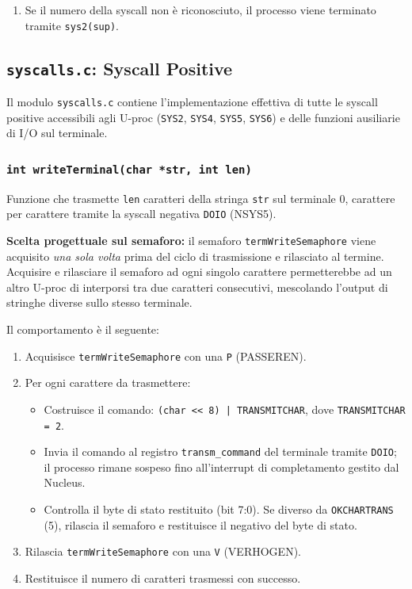\documentclass[a4paper,12pt]{article}
\begin{document}
\begin{enumerate}
\begin{enumerate}
    \item Se il numero della syscall non è riconosciuto, il processo viene terminato tramite \texttt{sys2(sup)}.
\end{enumerate}

\vspace{0.5cm}
\subsection{\texttt{syscalls.c}: Syscall Positive}

Il modulo \texttt{syscalls.c} contiene l'implementazione effettiva di tutte le
syscall positive accessibili agli U-proc (\texttt{SYS2}, \texttt{SYS4},
\texttt{SYS5}, \texttt{SYS6}) e delle funzioni ausiliarie di I/O sul terminale.

\vspace{0.3cm}



\subsubsection{\texttt{int writeTerminal(char *str, int len)}}
 
Funzione che trasmette \texttt{len} caratteri della
stringa \texttt{str} sul terminale 0, carattere per carattere tramite la syscall
negativa \texttt{DOIO} (NSYS5).
 
\medskip
\textbf{Scelta progettuale sul semaforo:} il semaforo \texttt{termWriteSemaphore}
viene acquisito \emph{una sola volta} prima del ciclo di trasmissione e rilasciato
al termine.
Acquisire e rilasciare il semaforo ad ogni singolo carattere permetterebbe ad
un altro U-proc di interporsi tra due caratteri consecutivi, mescolando l'output
di stringhe diverse sullo stesso terminale.
 
\medskip
Il comportamento è il seguente:
 
\begin{enumerate}
    \item Acquisisce \texttt{termWriteSemaphore} con una \texttt{P} (PASSEREN).
    \item Per ogni carattere da trasmettere:
    \begin{itemize}
        \item Costruisce il comando: \texttt{(char << 8) | TRANSMITCHAR},
              dove \texttt{TRANSMITCHAR = 2}.
        \item Invia il comando al registro \texttt{transm\_command} del terminale
              tramite \texttt{DOIO}; il processo rimane sospeso fino all'interrupt
              di completamento gestito dal Nucleus.
        \item Controlla il byte di stato restituito (bit 7:0). Se diverso da
              \texttt{OKCHARTRANS} (5), rilascia il semaforo e restituisce il
              negativo del byte di stato.
    \end{itemize}
    \item Rilascia \texttt{termWriteSemaphore} con una \texttt{V} (VERHOGEN).
    \item Restituisce il numero di caratteri trasmessi con successo.
\end{enumerate}
 

\end{enumerate}
\end{document}

